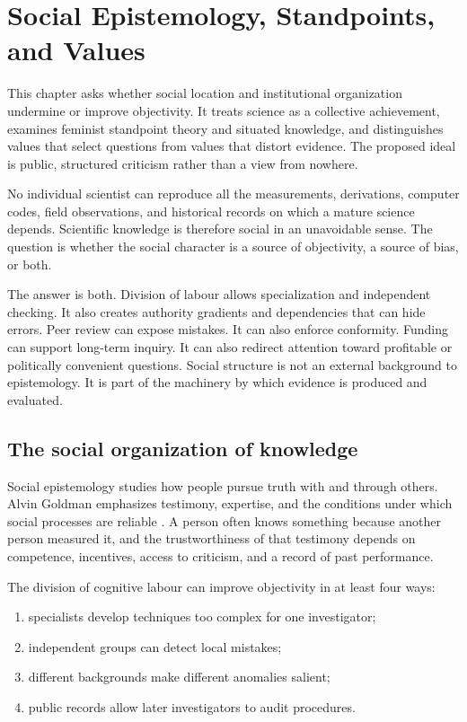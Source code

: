 \chapter{Social Epistemology, Standpoints, and Values}
\label{ch:social}

\begin{chapterguide}
This chapter asks whether social location and institutional organization
undermine or improve objectivity. It treats science as a collective achievement,
examines feminist standpoint theory and situated knowledge, and distinguishes
values that select questions from values that distort evidence. The proposed
ideal is public, structured criticism rather than a view from nowhere.
\end{chapterguide}

No individual scientist can reproduce all the measurements, derivations,
computer codes, field observations, and historical records on which a mature
science depends. Scientific knowledge is therefore social in an unavoidable
sense. The question is whether the social character is a source of objectivity,
a source of bias, or both.

The answer is both. Division of labour allows specialization and independent
checking. It also creates authority gradients and dependencies that can hide
errors. Peer review can expose mistakes. It can also enforce conformity.
Funding can support long-term inquiry. It can also redirect attention toward
profitable or politically convenient questions. Social structure is not an
external background to epistemology. It is part of the machinery by which
evidence is produced and evaluated.

\section{The social organization of knowledge}

Social epistemology studies how people pursue truth with and through others.
Alvin Goldman emphasizes testimony, expertise, and the conditions under which
social processes are reliable \citep{goldman1999}. A person often knows
something because another person measured it, and the trustworthiness of that
testimony depends on competence, incentives, access to criticism, and a record
of past performance.

The division of cognitive labour can improve objectivity in at least four ways:

\begin{enumerate}
\item specialists develop techniques too complex for one investigator;
\item independent groups can detect local mistakes;
\item different backgrounds make different anomalies salient;
\item public records allow later investigators to audit procedures.
\end{enumerate}


